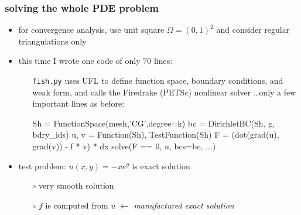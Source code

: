 \documentclass[hide notes,intlimits,usenames,dvipsnames]{beamer}
\begin{document}
\begin{frame}[fragile]
\frametitle{solving the whole PDE problem}

\begin{itemize}
\item \begin{minipage}[t]{0.58\textwidth}
for convergence analysis, use unit square $\Omega = (0,1)^2$ and consider regular triangulations only
\end{minipage} \hfill
\begin{minipage}[t]{0.25\textwidth}
\vspace{0mm}


\end{minipage}

\medskip
\item this time I wrote one code of only 70 lines:
	\begin{itemize}
	\item[\texttt{fish.py}] uses UFL to define function space, boundary conditions, and weak form, and calls the Firedrake (PETSc) nonlinear solver \dots  only a few important lines as before:

\medskip
\begin{tinycode}
Sh = FunctionSpace(mesh,'CG',degree=k)
bc = DirichletBC(Sh, g, bdry_ids)
u, v = Function(Sh), TestFunction(Sh)
F = (dot(grad(u), grad(v)) - f * v) * dx
solve(F == 0, u, bcs=bc, ...)
\end{tinycode}
	\end{itemize}
\item test problem: $u(x,y)=-xe^y$ is exact solution
    \begin{itemize}
    \item[$\circ$] very smooth solution
    \item[$\circ$] $f$ is computed from $u$ \hfill $\longleftarrow$ \emph{manufactured exact solution}
    \end{itemize}
\end{itemize}
\end{frame}
\end{document}

